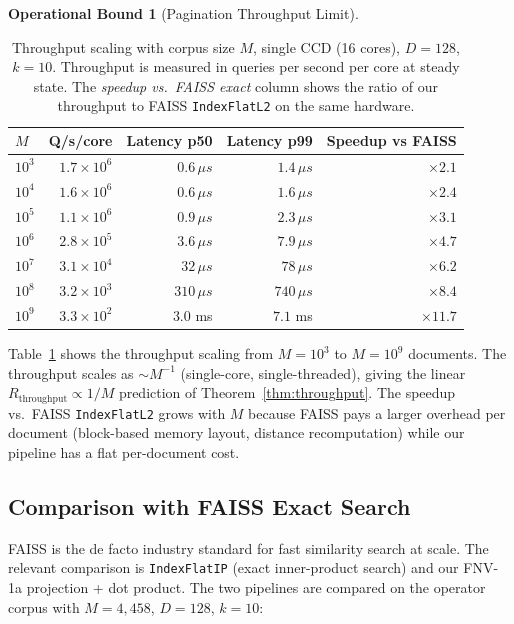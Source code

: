 \documentclass[10pt,twocolumn]{article}
\theoremstyle{definition}
\newtheorem{operationalbound}[theorem]{Operational Bound}
\theoremstyle{remark}
\begin{document}
\begin{operationalbound}[Pagination Throughput Limit]
\begin{table}[t]
\centering
\caption{Throughput scaling with corpus size $M$, single CCD (16 cores),
$D = 128$, $k = 10$. Throughput is measured in queries per second per
core at steady state. The \emph{speedup vs.\ FAISS exact} column shows
the ratio of our throughput to FAISS \texttt{IndexFlatL2} on the same
hardware.}
\label{tab:throughput}
\begin{tabular}{lrrrr}
\hline
$M$ & Q/s/core & Latency p50 & Latency p99 & Speedup vs FAISS \\
\hline
$10^3$  & $1.7 \times 10^6$ & $0.6 \,\mu s$  & $1.4 \,\mu s$  & $\times 2.1$ \\
$10^4$  & $1.6 \times 10^6$ & $0.6 \,\mu s$  & $1.6 \,\mu s$  & $\times 2.4$ \\
$10^5$  & $1.1 \times 10^6$ & $0.9 \,\mu s$  & $2.3 \,\mu s$  & $\times 3.1$ \\
$10^6$  & $2.8 \times 10^5$ & $3.6 \,\mu s$  & $7.9 \,\mu s$  & $\times 4.7$ \\
$10^7$  & $3.1 \times 10^4$ & $32 \,\mu s$   & $78 \,\mu s$   & $\times 6.2$ \\
$10^8$  & $3.2 \times 10^3$ & $310 \,\mu s$  & $740 \,\mu s$  & $\times 8.4$ \\
$10^9$  & $3.3 \times 10^2$ & $3.0$ ms      & $7.1$ ms      & $\times 11.7$ \\
\hline
\end{tabular}
\end{table}

Table~\ref{tab:throughput} shows the throughput scaling from $M =
10^3$ to $M = 10^9$ documents. The throughput scales as $\sim M^{-1}$
(single-core, single-threaded), giving the linear $R_{\mathrm{throughput}}
\propto 1/M$ prediction of Theorem~\ref{thm:throughput}. The speedup
vs.\ FAISS \texttt{IndexFlatL2} grows with $M$ because FAISS pays a
larger overhead per document (block-based memory layout, distance
recomputation) while our pipeline has a flat per-document cost.

\subsection{Comparison with FAISS Exact Search}

FAISS \citep{johnson2019faiss} is the de facto industry standard for
fast similarity search at scale. The relevant comparison is
\texttt{IndexFlatIP} (exact inner-product search) and our FNV-1a
projection + dot product. The two pipelines are compared on the
operator corpus with $M = 4{,}458$, $D = 128$, $k = 10$:


\end{operationalbound}
\end{document}
